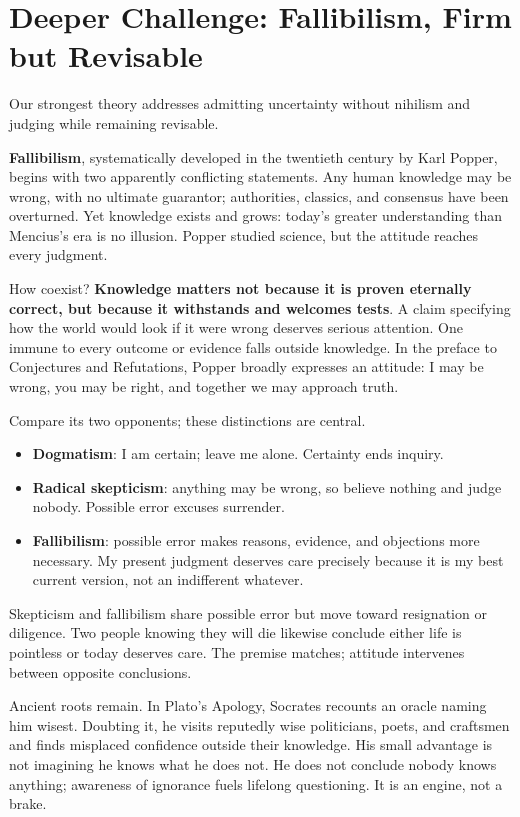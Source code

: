 \section[Fallibilism: Firm but Revisable]{Deeper Challenge: Fallibilism, Firm but Revisable}
Our strongest theory addresses admitting uncertainty without nihilism and judging while remaining revisable.

\textbf{Fallibilism}, systematically developed in the twentieth century by Karl Popper, begins with two apparently conflicting statements. Any human knowledge may be wrong, with no ultimate guarantor; authorities, classics, and consensus have been overturned. Yet knowledge exists and grows: today's greater understanding than Mencius's era is no illusion. Popper studied science, but the attitude reaches every judgment.

How coexist? \textbf{Knowledge matters not because it is proven eternally correct, but because it withstands and welcomes tests}. A claim specifying how the world would look if it were wrong deserves serious attention. One immune to every outcome or evidence falls outside knowledge. In the preface to Conjectures and Refutations, Popper broadly expresses an attitude: I may be wrong, you may be right, and together we may approach truth.

Compare its two opponents; these distinctions are central.

\begin{itemize}
\item \textbf{Dogmatism}: I am certain; leave me alone. Certainty ends inquiry.
\item \textbf{Radical skepticism}: anything may be wrong, so believe nothing and judge nobody. Possible error excuses surrender.
\item \textbf{Fallibilism}: possible error makes reasons, evidence, and objections more necessary. My present judgment deserves care precisely because it is my best current version, not an indifferent whatever.
\end{itemize}
Skepticism and fallibilism share possible error but move toward resignation or diligence. Two people knowing they will die likewise conclude either life is pointless or today deserves care. The premise matches; attitude intervenes between opposite conclusions.

Ancient roots remain. In Plato's Apology, Socrates recounts an oracle naming him wisest. Doubting it, he visits reputedly wise politicians, poets, and craftsmen and finds misplaced confidence outside their knowledge. His small advantage is not imagining he knows what he does not. He does not conclude nobody knows anything; awareness of ignorance fuels lifelong questioning. It is an engine, not a brake.

